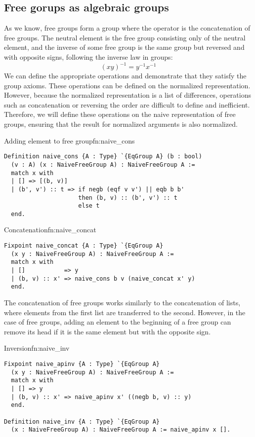\subsection{Free gorups as algebraic groups}
As we know, free groups form a group where the operator is the concatenation of free groups. The neutral element is the free group consisting only of the neutral element, and the inverse of some free group is the same group but reversed and with opposite signs, following the inverse law in groups:
$$
(xy)^{-1} = y^{-1}x^{-1}
$$
We can define the appropriate operations and demonstrate that they satisfy the group axioms. These operations can be defined on the normalized representation. However, because the normalized representation is a list of differences, operations such as concatenation or reversing the order are difficult to define and inefficient. Therefore, we will define these operations on the naive representation of free groups, ensuring that the result for normalized arguments is also normalized.
\begin{func}{Adding element to free group}{fn:naive_cons}
\begin{verbatim}
Definition naive_cons {A : Type} `{EqGroup A} (b : bool) 
  (v : A) (x : NaiveFreeGroup A) : NaiveFreeGroup A :=
  match x with
  | [] => [(b, v)]
  | (b', v') :: t => if negb (eqf v v') || eqb b b'
                     then (b, v) :: (b', v') :: t
                     else t
  end.
\end{verbatim}
\end{func}
\begin{func}{Concatenation}{fn:naive_concat}
\begin{verbatim}
Fixpoint naive_concat {A : Type} `{EqGroup A} 
  (x y : NaiveFreeGroup A) : NaiveFreeGroup A :=
  match x with
  | []           => y
  | (b, v) :: x' => naive_cons b v (naive_concat x' y)
  end.
\end{verbatim}
\end{func}
The concatenation of free groups  works similarly to the concatenation of lists, where elements from the first list are transferred to the second. However, in the case of free groups, adding an element to the beginning of a free group can remove its head if it is the same element but with the opposite sign.
\begin{func}{Inversion}{fn:naive_inv}
\begin{verbatim}
Fixpoint naive_apinv {A : Type} `{EqGroup A} 
  (x y : NaiveFreeGroup A) : NaiveFreeGroup A :=
  match x with
  | [] => y
  | (b, v) :: x' => naive_apinv x' ((negb b, v) :: y)
  end.

Definition naive_inv {A : Type} `{EqGroup A} 
  (x : NaiveFreeGroup A) : NaiveFreeGroup A := naive_apinv x [].
\end{verbatim}
\end{func}
